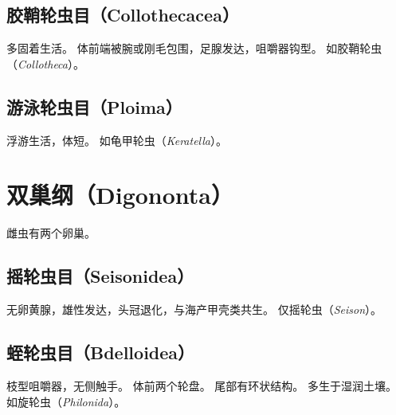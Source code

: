 \documentclass[11pt]{article}
\begin{document}
\subsection{胶鞘轮虫目（Collothecacea）}
多固着生活。
体前端被腕或刚毛包围，足腺发达，咀嚼器钩型。
如胶鞘轮虫（\textit{Collotheca}）。

\subsection{游泳轮虫目（Ploima）}
浮游生活，体短。
如龟甲轮虫（\textit{Keratella}）。

\section{双巢纲（Digononta）}
雌虫有两个卵巢。

\subsection{摇轮虫目（Seisonidea）}
无卵黄腺，雄性发达，头冠退化，与海产甲壳类共生。
仅摇轮虫（\textit{Seison}）。

\subsection{蛭轮虫目（Bdelloidea）}
枝型咀嚼器，无侧触手。
体前两个轮盘。
尾部有环状结构。
多生于湿润土壤。
如旋轮虫（\textit{Philonida}）。
\end{document}
